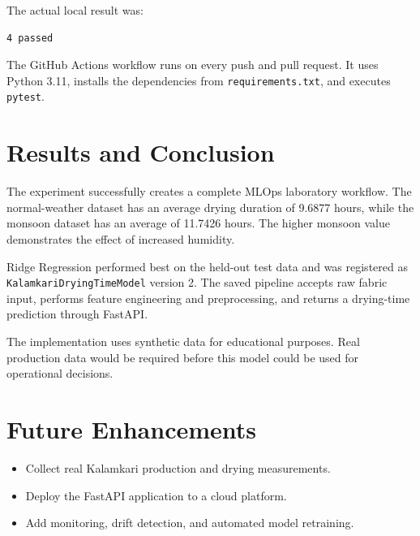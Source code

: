 \documentclass[12pt,a4paper]{article}
\begin{document}
The actual local result was:

\begin{lstlisting}
4 passed
\end{lstlisting}

The GitHub Actions workflow runs on every push and pull request. It uses Python 3.11, installs the dependencies from \texttt{requirements.txt}, and executes \texttt{pytest}.

\section{Results and Conclusion}
The experiment successfully creates a complete MLOps laboratory workflow. The normal-weather dataset has an average drying duration of 9.6877 hours, while the monsoon dataset has an average of 11.7426 hours. The higher monsoon value demonstrates the effect of increased humidity.

Ridge Regression performed best on the held-out test data and was registered as \texttt{KalamkariDryingTimeModel} version 2. The saved pipeline accepts raw fabric input, performs feature engineering and preprocessing, and returns a drying-time prediction through FastAPI.

The implementation uses synthetic data for educational purposes. Real production data would be required before this model could be used for operational decisions.

\section{Future Enhancements}
\begin{itemize}[leftmargin=*]
    \item Collect real Kalamkari production and drying measurements.
    \item Deploy the FastAPI application to a cloud platform.
    \item Add monitoring, drift detection, and automated model retraining.
\end{itemize}
\end{document}
